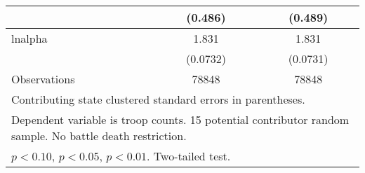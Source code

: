 \begin{table}[htbp]
\begin{tabular}{l*{2}{c}}
                    &     (0.486)        &     (0.489)        \\
\hline
lnalpha             &       1.831\sym{**}&       1.831\sym{**}\\
                    &    (0.0732)        &    (0.0731)        \\
\hline
Observations        &       78848        &       78848        \\
\hline\hline
\multicolumn{3}{l}{\fontsize{8}{8}\selectfont Contributing state clustered standard errors in parentheses.}\\
\multicolumn{3}{l}{\fontsize{8}{8}\selectfont Dependent variable is troop counts. 15 potential contributor random sample. No battle death restriction.}\\
\multicolumn{3}{l}{\fontsize{8}{8}\selectfont \sym{\dagger} \(p<0.10\), \sym{*} \(p<0.05\), \sym{**} \(p<0.01\). Two-tailed test.}\\
\end{tabular}
\vspace{-10em}
\end{table}
